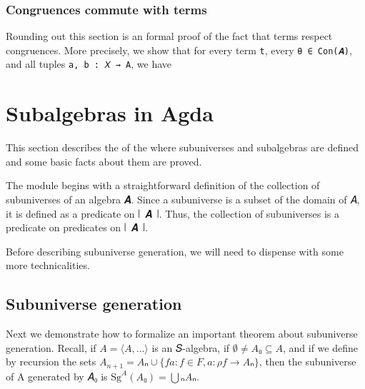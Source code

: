 \documentclass[a4paper,USenglish,cleveref,autoref,thm-restate]{lipics-v2019}
\begin{document}
\subsubsection{Congruences commute with terms}\label{congruences-commute-with-terms}
Rounding out this section is an formal proof of the fact that terms respect congruences. More precisely, we show that for every term \texttt{t}, every \texttt{θ\ ∈\ Con(𝑨)}, and all tuples \texttt{a,\ b\ :\ 𝑋\ →\ A}, we have

\section{Subalgebras in Agda}\label{sec:subs-in-agda}
This section describes the \subsmodule of the \agdaualib where subuniverses and subalgebras are defined and some basic facts about them are proved.



The module begins with a straightforward definition of the collection of subuniverses of an algebra 𝑨. Since a subuniverse is a subset of the domain of 𝐴, it is defined as a predicate on ∣~𝑨~∣. Thus, the collection of subuniverses is a predicate on predicates on ∣~𝑨~∣.
\begin{code}\end{code}

Before describing subuniverse generation, we will need to dispense with some more technicalities.
\begin{code}\end{code}

\subsection{Subuniverse generation}\label{subuniverse-generation}
Next we demonstrate how to formalize an important theorem about subuniverse generation. Recall, if \(A = ⟨𝐴, …⟩\) is an 𝑆-algebra, if \(∅ ≠ 𝐴₀ ⊆ 𝐴\), and if we define by recursion the sets \(A_{n+1} = Aₙ ∪ \{ f a : f ∈ F, a : ρ f → Aₙ \}\), then the subuniverse of A generated by 𝐴₀ is \(\mathrm{Sg}^A(A₀) = ⋃ₙ Aₙ\).
\begin{code}\end{code}
\end{document}

